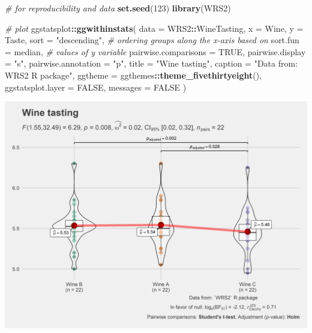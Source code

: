 \documentclass[
]{article}
\newenvironment{Shaded}{\begin{snugshade}}{\end{snugshade}}
\newcommand{\CommentTok}[1]{\textcolor[rgb]{0.56,0.35,0.01}{\textit{#1}}}
\newcommand{\DataTypeTok}[1]{\textcolor[rgb]{0.13,0.29,0.53}{#1}}
\newcommand{\DecValTok}[1]{\textcolor[rgb]{0.00,0.00,0.81}{#1}}
\newcommand{\KeywordTok}[1]{\textcolor[rgb]{0.13,0.29,0.53}{\textbf{#1}}}
\newcommand{\NormalTok}[1]{#1}
\newcommand{\OperatorTok}[1]{\textcolor[rgb]{0.81,0.36,0.00}{\textbf{#1}}}
\newcommand{\OtherTok}[1]{\textcolor[rgb]{0.56,0.35,0.01}{#1}}
\newcommand{\StringTok}[1]{\textcolor[rgb]{0.31,0.60,0.02}{#1}}
\begin{document}
\begin{Shaded}
\begin{Highlighting}[]
\CommentTok{\# for reproducibility and data}
\KeywordTok{set.seed}\NormalTok{(}\DecValTok{123}\NormalTok{)}
\KeywordTok{library}\NormalTok{(WRS2)}

\CommentTok{\# plot}
\NormalTok{ggstatsplot}\OperatorTok{::}\KeywordTok{ggwithinstats}\NormalTok{(}
  \DataTypeTok{data =}\NormalTok{ WRS2}\OperatorTok{::}\NormalTok{WineTasting,}
  \DataTypeTok{x =}\NormalTok{ Wine,}
  \DataTypeTok{y =}\NormalTok{ Taste,}
  \DataTypeTok{sort =} \StringTok{"descending"}\NormalTok{, }\CommentTok{\# ordering groups along the x{-}axis based on}
  \DataTypeTok{sort.fun =}\NormalTok{ median, }\CommentTok{\# values of \textasciigrave{}y\textasciigrave{} variable}
  \DataTypeTok{pairwise.comparisons =} \OtherTok{TRUE}\NormalTok{,}
  \DataTypeTok{pairwise.display =} \StringTok{"s"}\NormalTok{,}
  \DataTypeTok{pairwise.annotation =} \StringTok{"p"}\NormalTok{,}
  \DataTypeTok{title =} \StringTok{"Wine tasting"}\NormalTok{,}
  \DataTypeTok{caption =} \StringTok{"Data from: \textasciigrave{}WRS2\textasciigrave{} R package"}\NormalTok{,}
  \DataTypeTok{ggtheme =}\NormalTok{ ggthemes}\OperatorTok{::}\KeywordTok{theme\_fivethirtyeight}\NormalTok{(),}
  \DataTypeTok{ggstatsplot.layer =} \OtherTok{FALSE}\NormalTok{,}
  \DataTypeTok{messages =} \OtherTok{FALSE}
\NormalTok{)}
\end{Highlighting}
\end{Shaded}

\includegraphics[width=1\linewidth]{./figures/paper-ggwithinstats1-1}
\end{document}
